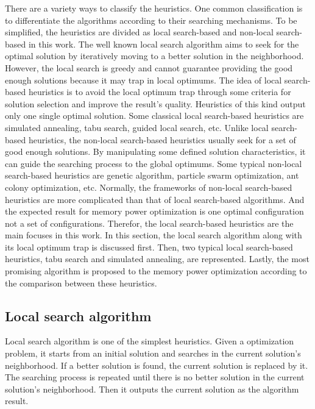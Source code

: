 	There are a variety ways to classify the heuristics. One common classification is to differentiate the algorithms
	according to their searching mechanisms. To be simplified, the heuristics are divided as local search-based and
	non-local search-based in this work. The well known local search algorithm aims to seek for the optimal solution by
	iteratively moving to a better solution in the neighborhood. However, the local search is greedy and cannot guarantee providing the good enough solutions because it may trap in local optimums. The idea of local search-based heuristics
	is to avoid the local optimum trap through some criteria for solution selection and improve the result's quality.
	Heuristics of this kind output only one single optimal solution. Some classical local search-based heuristics are simulated annealing, tabu search, guided local search, etc. Unlike local search-based heuristics, the non-local search-based heuristics usually seek for a set of good enough solutions. By manipulating some defined solution characteristics, it can guide the searching process to the global optimums. Some typical non-local search-based heuristics are genetic algorithm, particle swarm optimization, ant colony optimization, etc.
	Normally, the frameworks of non-local search-based heuristics are more complicated than that of local search-based algorithms. And the expected result for memory power optimization is one optimal configuration not a set of
	configurations. Therefor, the local search-based heuristics are the main focuses in this work.
	In this section, the local search algorithm along with its local optimum trap is discussed first. Then, two typical
	local search-based heuristics, tabu search and simulated annealing, are represented. Lastly, the most promising algorithm 
	is proposed to the memory power optimization according to the comparison between these heuristics.
	
		\subsection{Local search algorithm}
		\label{subsec:local_search}
		Local search algorithm is one of the simplest heuristics. Given a optimization problem, it starts from an initial solution and searches in the current solution's neighborhood. If a better solution is found, the current solution is replaced by it. The searching process is repeated until there is no better solution in the current solution's neighborhood. Then it outputs the current solution as the algorithm result.
		
